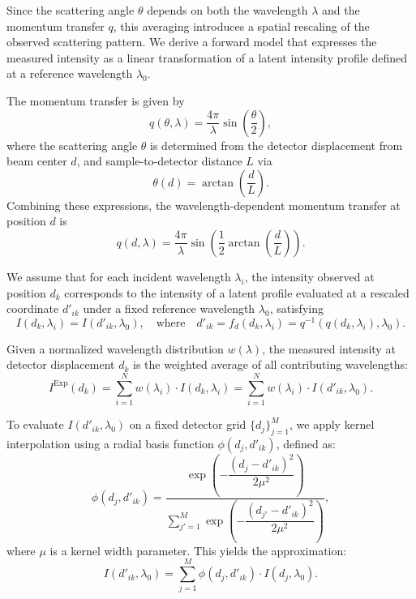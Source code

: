 \documentclass[12pt]{article}
\begin{document}
Since the scattering angle \( \theta \) depends on both the wavelength \( \lambda \) and the momentum transfer \( q \), this averaging introduces a spatial rescaling of the observed scattering pattern. We derive a forward model that expresses the measured intensity as a linear transformation of a latent intensity profile defined at a reference wavelength \( \lambda_0 \).

The momentum transfer is given by
\begin{equation}
    q(\theta, \lambda) = \frac{4\pi}{\lambda} \sin\left( \frac{\theta}{2} \right),
    \label{eq:q_theta_lambda}
\end{equation}
where the scattering angle \( \theta \) is determined from the detector displacement from beam center \( d \), and sample-to-detector distance \( L \) via
\begin{equation}
    \theta(d) = \arctan\left( \frac{d}{L} \right).
    \label{eq:theta_d}
\end{equation}
Combining these expressions, the wavelength-dependent momentum transfer at position \( d \) is
\begin{equation}
    q(d, \lambda) = \frac{4\pi}{\lambda} \sin\left( \frac{1}{2} \arctan\left( \frac{d}{L} \right) \right).
    \label{eq:q_d_lambda}
\end{equation}

We assume that for each incident wavelength \( \lambda_i \), the intensity observed at position \( d_k \) corresponds to the intensity of a latent profile evaluated at a rescaled coordinate \( d'_{ik} \) under a fixed reference wavelength \( \lambda_0 \), satisfying
\begin{equation}
    I(d_k, \lambda_i) = I(d'_{ik}, \lambda_0), \quad \text{where} \quad
    d'_{ik} = f_d(d_k, \lambda_i) = q^{-1}(q(d_k, \lambda_i), \lambda_0).
    \label{eq:stretching_relation}
\end{equation}

Given a normalized wavelength distribution \( w(\lambda) \), the measured intensity at detector displacement \( d_k \) is the weighted average of all contributing wavelengths:
\begin{equation}
    I^{\mathrm{Exp}}(d_k) = \sum_{i=1}^N w(\lambda_i) \cdot I(d_k, \lambda_i) = \sum_{i=1}^N w(\lambda_i) \cdot I(d'_{ik}, \lambda_0).
    \label{eq:averaged_I_exp}
\end{equation}

To evaluate \( I(d'_{ik}, \lambda_0) \) on a fixed detector grid \( \{ d_j \}_{j=1}^M \), we apply kernel interpolation using a radial basis function \( \phi(d_j, d'_{ik}) \), defined as:
\begin{equation}
    \phi(d_j, d'_{ik}) = \frac{\exp\left( -\dfrac{(d_j - d'_{ik})^2}{2\mu^2} \right)}{\sum_{j'=1}^M \exp\left( -\dfrac{(d_{j'} - d'_{ik})^2}{2\mu^2} \right)},
    \label{eq:rbf_kernel}
\end{equation}
where \( \mu \) is a kernel width parameter. This yields the approximation:
\begin{equation}
    I(d'_{ik}, \lambda_0) = \sum_{j=1}^M \phi(d_j, d'_{ik}) \cdot I(d_j, \lambda_0).
    \label{eq:interpolation}
\end{equation}
\end{document}
